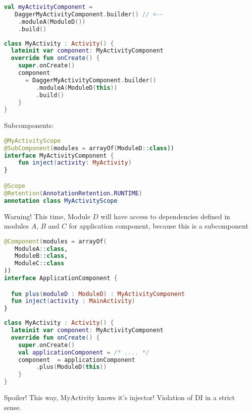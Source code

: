 \documentclass[10pt]{beamer}
\begin{document}
	\begin{frame}[fragile]
\begin{lstlisting}[language=Kotlin, basicstyle=\ttfamily]
val myActivityComponent = 
   DaggerMyActivityComponent.builder() // <--
    .moduleA(ModuleD())
    .build()
\end{lstlisting} 
\end{frame}
	\begin{frame}[fragile]
\begin{lstlisting}[language=Kotlin, basicstyle=\ttfamily]
class MyActivity : Activity() {
  lateinit var component: MyActivityComponent
  override fun onCreate() {
    super.onCreate()
    component  
      = DaggerMyActivityComponent.builder()
         .moduleA(ModuleD(this))
         .build()
    }
}
\end{lstlisting} 
\end{frame}
\begin{frame}[fragile]
	Subcomponents:
\begin{lstlisting}[language=Kotlin, basicstyle=\ttfamily]
@MyActivityScope
@SubComponent(modules = arrayOf(ModuleD::class))
interface MyActivityComponent {
    fun inject(activity: MyActivity)
}

@Scope
@Retention(AnnotationRetention.RUNTIME)
annotation class MyActivityScope
\end{lstlisting} 
		\begin{alertblock}{Warning!}
This time, Module $D$ will have access to dependencies defined in modules $A$, $B$ and $C$ for application component, because this is a subcomponent
		\end{alertblock}
\end{frame}
	\begin{frame}[fragile]
\begin{lstlisting}[language=Kotlin, basicstyle=\ttfamily]
@Component(modules = arrayOf(
   ModuleA::class,
   ModuleB::class,
   ModuleC::class
))
interface ApplicationComponent {

  fun plus(moduleD : ModuleD) : MyActivityComponent
  fun inject(activity : MainActivity)
}

\end{lstlisting} 
	\end{frame}

\begin{frame}[fragile]
\begin{lstlisting}[language=Kotlin, basicstyle=\ttfamily]
class MyActivity : Activity() {
  lateinit var component: MyActivityComponent
  override fun onCreate() {
    super.onCreate()
    val applicationComponent = /* .... */
    component  = applicationComponent
         .plus(ModuleD(this))
    }
}
\end{lstlisting} 
		\begin{alertblock}{Spoiler!}
This way, MyActivity knows it's injector!  Violation of DI in a strict sense.
		\end{alertblock}
\end{frame}
\end{document}
